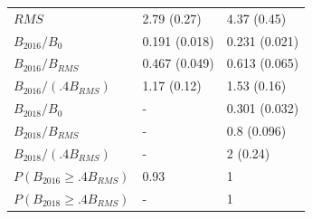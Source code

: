 \documentclass[11pt]{book}
\begin{document}
\begin{longtable}[t]{lll}
$RMS$ & 2.79 (0.27) & 4.37 (0.45)\\
$B_{2016}/B_0$ & 0.191 (0.018) & 0.231 (0.021)\\
$B_{2016}/B_{RMS}$ & 0.467 (0.049) & 0.613 (0.065)\\
$B_{2016}/(.4B_{RMS})$ & 1.17 (0.12) & 1.53 (0.16)\\
$B_{2018}/B_0$ & - & 0.301 (0.032)\\
$B_{2018}/B_{RMS}$ & - & 0.8 (0.096)\\
$B_{2018}/(.4B_{RMS})$ & - & 2 (0.24)\\
$P(B_{2016} \geq .4B_{RMS})$ & 0.93 & 1\\
$P(B_{2018} \geq .4B_{RMS})$ & - & 1\\
\bottomrule
\end{longtable}
\endgroup{}
\endgroup{}

\newpage
\end{document}
